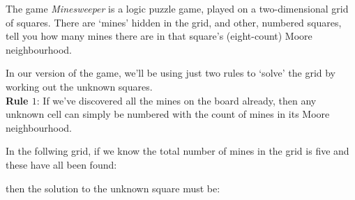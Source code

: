 
The game {\it Minesweeper}
is a logic puzzle game, played on a two-dimensional
grid of squares. There are `mines' hidden in the grid, and other, numbered squares,
tell you how many mines there are in that square's (eight-count) Moore neighbourhood.

In our version of the game, we'll be
using just two rules to `solve' the grid by working out the unknown squares.
\\[1em]
{\bf Rule $1$}: If we've discovered all the mines on the board already, then any unknown cell
can simply be numbered with the count of mines in its Moore neighbourhood.

In the follwing grid,
if we know the total number of mines in the grid is five and these have all been found:\\
\begin{center}
\end{center}

\noindent then the solution to the unknown square must be:\\
\begin{center}
\end{center}

